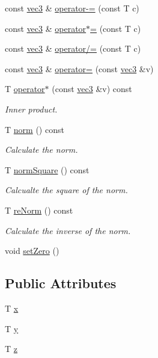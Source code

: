 \begin{DoxyCompactItemize}
\item 
const \mbox{\hyperlink{structvec3}{vec3}} \& \mbox{\hyperlink{structvec3_ac7fa0e349317986caa29b4450612f164}{operator-\/=}} (const T c)
\item 
const \mbox{\hyperlink{structvec3}{vec3}} \& \mbox{\hyperlink{structvec3_a7989a4ee0a46d2ec4286795ab6852636}{operator$\ast$=}} (const T c)
\item 
const \mbox{\hyperlink{structvec3}{vec3}} \& \mbox{\hyperlink{structvec3_a7641a7bd40a69bad917f423017d8efa6}{operator/=}} (const T c)
\item 
const \mbox{\hyperlink{structvec3}{vec3}} \& \mbox{\hyperlink{structvec3_ad2cd7d64d02aa394c736ccc7054e5411}{operator=}} (const \mbox{\hyperlink{structvec3}{vec3}} \&v)
\item 
T \mbox{\hyperlink{structvec3_a339b8432cc6f88eb9da83c6075f1f5af}{operator$\ast$}} (const \mbox{\hyperlink{structvec3}{vec3}} \&v) const
\begin{DoxyCompactList}\small\item\em Inner product. \end{DoxyCompactList}\item 
T \mbox{\hyperlink{structvec3_a1bde56ffdf0b5915f9b2e75b56db63e8}{norm}} () const
\begin{DoxyCompactList}\small\item\em Calculate the norm. \end{DoxyCompactList}\item 
T \mbox{\hyperlink{structvec3_ab08eac50c74f6630a05a7fafed13dccc}{norm\+Square}} () const
\begin{DoxyCompactList}\small\item\em Calcualte the square of the norm. \end{DoxyCompactList}\item 
T \mbox{\hyperlink{structvec3_a8539e3e4fbf555f6bd464fdc75fdfd56}{re\+Norm}} () const
\begin{DoxyCompactList}\small\item\em Calculate the inverse of the norm. \end{DoxyCompactList}\item 
void \mbox{\hyperlink{structvec3_a4bfe30989d83b8f3b5b3d2177f804360}{set\+Zero}} ()
\end{DoxyCompactItemize}
\subsection*{Public Attributes}
\begin{DoxyCompactItemize}
\item 
T \mbox{\hyperlink{structvec3_a3f1f0c60e13b8bf67f64b1afc9cd6d1a}{x}}
\item 
T \mbox{\hyperlink{structvec3_a77c2f238c0b2b7895304f5ca64b8d770}{y}}
\item 
T \mbox{\hyperlink{structvec3_a7879033e3409225479ae0079c92d9afd}{z}}
\end{DoxyCompactItemize}
